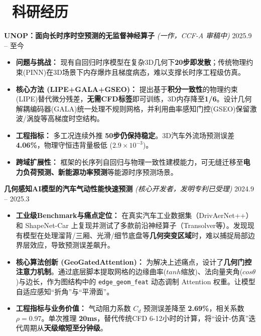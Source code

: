 \documentclass[11pt]{article}
\newlength{\interProjectSpacing}
\newcommand{\projectsep}{\vspace{\interProjectSpacing}}
\begin{document}

\section{\makebox[\widthof{\faUsers}][c]{\color{CVBlue}\faUsers}\ 
科研经历}
\textbf{UNOP：面向长时序时空预测的无监督神经算子} 
\textit{(一作，CCF-A 审稿中)} 
\hfill 2025.9 -- 至今
\begin{itemize}
    \item \textbf{问题与挑战：} 现有自回归时序模型在复杂3D几何下\textbf{20步即发散}；传统物理约束(PINN)在3D场景下内存爆炸且梯度病态，难以支撑长时序工程级仿真。
    \item \textbf{核心方法 (LIPE+GALA+GSEO)：} 提出基于\textbf{积分一致性}的物理约束(LIPE)替代微分残差，\textbf{无需CFD标签}即可训练，3D内存降至\textbf{1/6}。设计几何解耦编码器(GALA)统一处理不规则网格，并利用曲率感知门控(GSEO)保留激波/涡旋等高梯度时空结构。
    \item \textbf{工程指标：} 多工况连续外推 \textbf{50步仍保持稳定}。3D汽车外流场预测误差 \textbf{4.06\%}，物理守恒违背量极低 ($2.9\times10^{-3}$)。
    \item \textbf{跨域扩展性：} 框架的长序列自回归与物理一致性建模能力，可无缝迁移至\textbf{电力负荷预测、新能源功率预测}等能源时序预测场景。
\end{itemize}

\projectsep
\textbf{几何感知AI模型的汽车气动性能快速预测} 
\textit{(核心开发者，发明专利已受理)} 
\hfill 2024.9 -- 2025.3
\begin{itemize}
    \item \textbf{工业级Benchmark与痛点定位：} 在真实汽车工业数据集（DrivAerNet++）和 ShapeNet-Car 上复现并测试了多款前沿神经算子（Transolver等）。发现现有模型在处理溜背/三厢、光滑/细节底盘等\textbf{几何突变区域}时，难以捕捉局部边界层效应，导致预测误差飙升。
    \item \textbf{核心算法创新 (GeoGatedAttention)：} 为解决上述痛点，设计了\textbf{几何门控注意力机制}。通过底层脚本提取网格的边缘曲率($tanh$缩放)、法向量夹角($cos\theta$)与边长，作为图结构中的 \texttt{edge\_geom\_feat} 动态调制 Attention 权重。让模型自适应感知“折角”与“平滑面”。
    \item \textbf{工程指标与业务价值：} 气动阻力系数 $C_d$ 预测误差降至 \textbf{2.69\%}，相关系数 $\rho = 0.97$。单次推理 \textbf{20ms}，替代传统CFD 6-12小时的计算，将“设计-仿真”迭代周期从\textbf{天级缩短至分钟级}。
\end{itemize}
\end{document}
